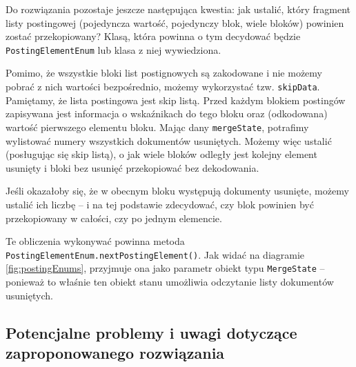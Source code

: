 Do rozwiązania pozostaje jeszcze następująca kwestia: jak ustalić, który fragment listy postingowej (pojedyncza wartość, pojedynczy blok, wiele bloków) powinien zostać przekopiowany? Klasą, która powinna o tym decydować będzie \texttt{PostingElementEnum} lub klasa z niej wywiedziona. 

Pomimo, że wszystkie bloki list postignowych są zakodowane i nie możemy pobrać z nich wartości bezpośrednio, możemy wykorzystać tzw. \texttt{skipData}. Pamiętamy, że lista postingowa jest skip listą. Przed każdym blokiem postingów zapisywana jest informacja o wskaźnikach do tego bloku oraz (odkodowana) wartość pierwszego elementu bloku. Mając dany \texttt{mergeState}, potrafimy wylistować numery wszystkich dokumentów usuniętych. Możemy więc ustalić (posługując się skip listą), o jak wiele bloków odległy jest kolejny element usunięty i bloki bez usunięć przekopiować bez dekodowania.

Jeśli okazałoby się, że w obecnym bloku występują dokumenty usunięte, możemy ustalić ich liczbę -- i na tej podstawie zdecydować, czy blok powinien być przekopiowany w całości, czy po jednym elemencie. 

Te obliczenia wykonywać powinna metoda \texttt{PostingElementEnum.nextPostingElement()}. Jak widać na diagramie \ref{fig:postingEnums}, przyjmuje ona jako parametr obiekt typu \texttt{MergeState} -- ponieważ to właśnie ten obiekt stanu umożliwia odczytanie listy dokumentów usuniętych.

\subsection{Potencjalne problemy i uwagi dotyczące zaproponowanego rozwiązania}


